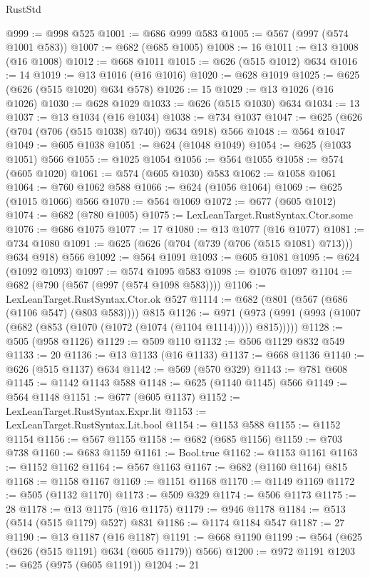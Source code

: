 \begin{lexlean}{RustStd}
\begin{coremodule}
@999 := @998 @525
@1001 := @686 @999 @583
@1005 := @567 (@997 (@574 @1001 @583))
@1007 := @682 (@685 @1005)
@1008 := 16
@1011 := @13 @1008 (@16 @1008)
@1012 := @668 @1011
@1015 := @626 (@515 @1012) @634
@1016 := 14
@1019 := @13 @1016 (@16 @1016)
@1020 := @628 @1019
@1025 := @625 (@626 (@515 @1020) @634 @578)
@1026 := 15
@1029 := @13 @1026 (@16 @1026)
@1030 := @628 @1029
@1033 := @626 (@515 @1030) @634
@1034 := 13
@1037 := @13 @1034 (@16 @1034)
@1038 := @734 @1037
@1047 := @625 (@626 (@704 (@706 (@515 @1038) @740)) @634 @918) @566
@1048 := @564 @1047
@1049 := @605 @1038
@1051 := @624 (@1048 @1049)
@1054 := @625 (@1033 @1051) @566
@1055 := @1025 @1054
@1056 := @564 @1055
@1058 := @574 (@605 @1020)
@1061 := @574 (@605 @1030) @583
@1062 := @1058 @1061
@1064 := @760 @1062 @588
@1066 := @624 (@1056 @1064)
@1069 := @625 (@1015 @1066) @566
@1070 := @564 @1069
@1072 := @677 (@605 @1012)
@1074 := @682 (@780 @1005)
@1075 := LexLeanTarget.RustSyntax.Ctor.some
@1076 := @686 @1075
@1077 := 17
@1080 := @13 @1077 (@16 @1077)
@1081 := @734 @1080
@1091 := @625 (@626 (@704 (@739 (@706 (@515 @1081) @713))) @634 @918) @566
@1092 := @564 @1091
@1093 := @605 @1081
@1095 := @624 (@1092 @1093)
@1097 := @574 @1095 @583
@1098 := @1076 @1097
@1104 := @682 (@790 (@567 (@997 (@574 @1098 @583))))
@1106 := LexLeanTarget.RustSyntax.Ctor.ok @527
@1114 := @682 (@801 (@567 (@686 (@1106 @547) (@803 @583)))) @815
@1126 := @971 (@973 (@991 (@993 (@1007 (@682 (@853 (@1070 (@1072 (@1074 (@1104 @1114))))) @815)))))
@1128 := @505 (@958 @1126)
@1129 := @509 @110
@1132 := @506 @1129 @832 @549
@1133 := 20
@1136 := @13 @1133 (@16 @1133)
@1137 := @668 @1136
@1140 := @626 (@515 @1137) @634
@1142 := @569 (@570 @329)
@1143 := @781 @608
@1145 := @1142 @1143 @588
@1148 := @625 (@1140 @1145) @566
@1149 := @564 @1148
@1151 := @677 (@605 @1137)
@1152 := LexLeanTarget.RustSyntax.Expr.lit
@1153 := LexLeanTarget.RustSyntax.Lit.bool
@1154 := @1153 @588
@1155 := @1152 @1154
@1156 := @567 @1155
@1158 := @682 (@685 @1156)
@1159 := @703 @738
@1160 := @683 @1159
@1161 := Bool.true
@1162 := @1153 @1161
@1163 := @1152 @1162
@1164 := @567 @1163
@1167 := @682 (@1160 @1164) @815
@1168 := @1158 @1167
@1169 := @1151 @1168
@1170 := @1149 @1169
@1172 := @505 (@1132 @1170)
@1173 := @509 @329
@1174 := @506 @1173
@1175 := 28
@1178 := @13 @1175 (@16 @1175)
@1179 := @946 @1178
@1184 := @513 (@514 (@515 @1179) @527) @831
@1186 := @1174 @1184 @547
@1187 := 27
@1190 := @13 @1187 (@16 @1187)
@1191 := @668 @1190
@1199 := @564 (@625 (@626 (@515 @1191) @634 (@605 @1179)) @566)
@1200 := @972 @1191
@1203 := @625 (@975 (@605 @1191))
@1204 := 21

\end{coremodule}
\end{lexlean}
